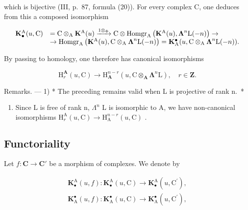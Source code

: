 which is bijective (III, p.~87, formula (20)). For every complex C, one deduces from this a composed isomorphism

\[
\begin{array}{r l} \mathbf {K} _ {\bullet} ^ {\mathrm{A}} (u, \mathrm{C}) & = \mathrm{C} \otimes_ {\mathrm{A}} \mathbf {K} ^ {\mathrm{A}} (u) \xrightarrow {1 \otimes_ {\Phi}} \mathrm{C} \otimes \operatorname{Homgr} _ {\mathrm{A}} \left(\mathbf {K} ^ {\mathrm{A}} (u), \boldsymbol {\Lambda} ^ {n} \mathrm{L} (- n)\right) \to \\ & \to \operatorname{Homgr} _ {\mathrm{A}} \left(\mathbf {K} ^ {\mathrm{A}} (u), \mathrm{C} \otimes_ {\mathrm{A}} \boldsymbol {\Lambda} ^ {n} \mathrm{L} (- n)\right) = \mathbf {K} _ {\mathrm{A}} ^ {\bullet} (u, \mathrm{C} \otimes_ {\mathrm{A}} \boldsymbol {\Lambda} ^ {n} \mathrm{L} (- n)). \end{array}
\]

By passing to homology, one therefore has canonical isomorphisms

\[
\mathrm{H} _ {r} ^ {\mathbf {A}} (u, \mathrm{C}) \rightarrow \mathrm{H} _ {\mathbf {A}} ^ {n - r} (u, \mathrm{C} \otimes_ {\mathbf {A}} \boldsymbol {\Lambda} ^ {n} \mathrm{L}), \quad r \in \mathbf {Z}.\tag{8}
\]

Remarks. --- 1) * The preceding remains valid when L is projective of rank n.~*

\begin{enumerate}
\def\labelenumi{\arabic{enumi})}
\setcounter{enumi}{1}
\tightlist
\item
  Since L is free of rank n, \(\Lambda^{n}\) L is isomorphic to A, we have non-canonical isomorphisms \(\mathrm{H}_{r}^{\mathrm{A}}(u,\mathrm{C})\to\mathrm{H}_{\mathrm{A}}^{n-r}(u,\mathrm{C})\) .
\end{enumerate}

\subsection{Functoriality}

Let \(f: \mathbf{C} \to \mathbf{C}'\) be a morphism of complexes. We denote by

\[
\begin{array}{l} \mathbf {K} _ {\bullet} ^ {\mathrm{A}} (u, f): \mathbf {K} _ {\bullet} ^ {\mathrm{A}} (u, \mathrm{C}) \to \mathbf {K} _ {\bullet} ^ {\mathrm{A}} (u, \mathrm{C} ^ {\prime}), \\ \mathbf {K} _ {\mathrm{A}} ^ {\bullet} (u, f): \mathbf {K} _ {\mathrm{A}} ^ {\bullet} (u, \mathrm{C}) \to \mathbf {K} _ {\mathrm{A}} ^ {\bullet} (u, \mathrm{C} ^ {\prime}), \end{array}
\]

